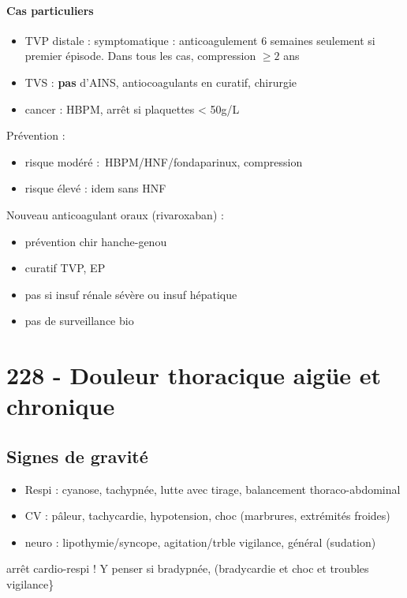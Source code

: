 \paragraph{Cas particuliers}
\begin{itemize}
  \item 
TVP distale : symptomatique : anticoagulement 6 semaines seulement si premier épisode. Dans tous les cas,
compression $\ge 2$ ans
\item \gls{TVS} : \textbf{pas} d'AINS, antiocoagulants en curatif, chirurgie
\item cancer : HBPM, arrêt si plaquettes < 50g/L
\end{itemize}
Prévention : 
\begin{itemize}
  \item risque modéré : HBPM/HNF/fondaparinux, compression
  \item risque élevé : idem sans HNF
\end{itemize}

Nouveau anticoagulant oraux (rivaroxaban) :
\begin{itemize}
  \item prévention chir hanche-genou
  \item curatif TVP, EP
  \item pas si insuf rénale sévère ou insuf hépatique
  \item pas de surveillance bio
\end{itemize}

\section{228 - Douleur thoracique aigüe et chronique}%
\label{sec:228_douleur_thoracique_aigue_et_chronique}

\subsection{Signes de gravité}
\begin{itemize}
\item Respi : cyanose, tachypnée, lutte avec tirage, balancement thoraco-abdominal
\item CV : pâleur, tachycardie, hypotension, choc (marbrures, extrémités
  froides)
\item neuro : lipothymie/syncope, agitation/trble vigilance, général (sudation)
\end{itemize}

\danger arrêt cardio-respi ! Y penser si bradypnée, (bradycardie et choc et troubles vigilance\}

